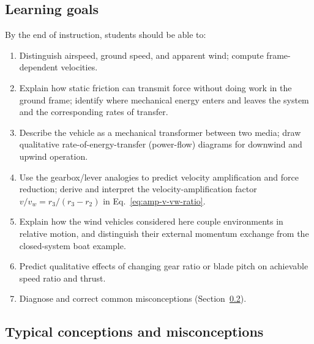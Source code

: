 \documentclass[reprint,aps,pra,longbibliography]{revtex4-2}
\begin{document}
\subsection{Learning goals}

By the end of instruction, students should be able to:
\begin{enumerate}
\item Distinguish airspeed, ground speed, and apparent wind; compute frame-dependent velocities.
\item Explain how static friction can transmit force without doing work in the ground frame; identify where mechanical energy enters and leaves the system and the corresponding rates of transfer.
\item Describe the vehicle as a mechanical transformer between two media; draw qualitative rate-of-energy-transfer (power-flow) diagrams for downwind and upwind operation.
\item Use the gearbox/lever analogies to predict velocity amplification and force reduction; derive and interpret the velocity-amplification factor $v/v_w = r_3/(r_3-r_2)$ in Eq.~\eqref{eq:amp-v-vw-ratio}.
\item Explain how the wind vehicles considered here couple environments in relative motion, and distinguish their external momentum exchange from the closed-system boat example.
\item Predict qualitative effects of changing gear ratio or blade pitch on achievable speed ratio and thrust.
\item Diagnose and correct common misconceptions (Section~\ref{sec:misconceptions}).
\end{enumerate}

\subsection{Typical conceptions and misconceptions}
\label{sec:misconceptions}
\end{document}
